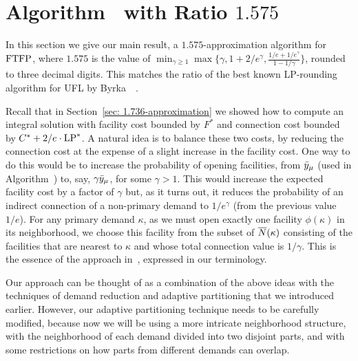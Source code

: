 
\section{Algorithm~{\EBGS} with Ratio $1.575$}\label{sec: 1.575-approximation}

In this section we give our main result, a $1.575$-approximation
algorithm for $\mbox{\rm FTFP}$, where $1.575$ is the value of $\min_{\gamma\geq
  1}\max\{\gamma, 1+2/e^\gamma, \frac{1/e+1/e^\gamma}{1-1/\gamma}\}$,
rounded to three decimal digits. This matches the ratio of the best
known LP-rounding algorithm for UFL by
Byrka~{\etal}~\cite{ByrkaGS10}. 

Recall that in Section~\ref{sec: 1.736-approximation} we showed how to compute an integral solution
with facility cost bounded by $F^\ast$ and connection cost bounded by
$C^\ast + 2/e\cdot\mbox{\rm LP}^\ast$. A natural idea is to balance these two
costs, by reducing the connection cost at the expense of a slight
increase in the facility cost. One way to do this would be to increase the
probability of opening facilities, from ${\bar y}_{\mu}$ (used in Algorithm~{\ECHS})
to, say, $\gamma{\bar y}_{\mu}$, for some $\gamma > 1$. This would increase the
expected facility cost by a factor of $\gamma$ but, as it turns out,
it reduces the probability of an indirect connection of a non-primary demand
to $1/e^\gamma$ (from the previous value $1/e$). For any primary demand $\kappa$, as we
must open exactly one facility $\phi(\kappa)$ in its neighborhood, we choose this
facility from the subset of ${\overline{N}}(\kappa)$ consisting of the facilities that
are nearest to $\kappa$ and whose total connection value is $1/\gamma$.
This is the essence of the approach in~\cite{ByrkaGS10}, expressed in our terminology.

Our approach can be thought of as a combination of the above ideas
with the techniques of demand reduction and
adaptive partitioning that we introduced earlier. However, our
adaptive partitioning technique needs to be carefully modified,
because now we will be using a more intricate neighborhood structure,
with the neighborhood of each demand divided into two disjoint parts,
and with some restrictions on how parts from different demands can overlap.


